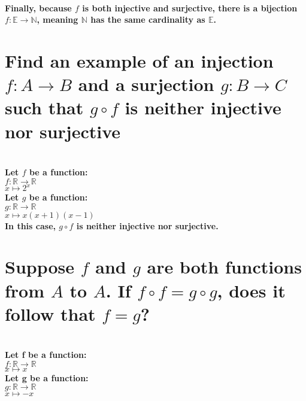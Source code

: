 \documentclass{article}
\begin{document}
\paragraph{\large
Finally, because \(f\) is both injective and surjective, there is a bijection \(f: \mathds{E} \rightarrow \mathds{N}\), meaning \(\mathds{N}\) has the same cardinality as \(\mathds{E}\).}

\newpage

\section{Find an example of an injection \(f: A \rightarrow B\) and a surjection \(g: B \rightarrow C\) such that \(g \circ f\) is neither injective nor surjective}

\paragraph{\large
\\Let \(f\) be a function:
\\\indent\(f: \mathds{R} \rightarrow \mathds{R}\)
\\\indent\(x \mapsto 2^x\)
\\ Let \(g\) be a function:
\\\indent \(g: \mathds{R} \rightarrow \mathds{R}\)
\\\indent \(x \mapsto x(x + 1)(x - 1)\)
\\ In this case, \(g \circ f\) is neither injective nor surjective.}

\newpage

\section{Suppose \(f\) and \(g\) are both functions from \(A\) to \(A\). If \(f \circ f = g \circ g\), does it follow that \(f = g\)?}

\paragraph{\large
\\ Let f be a function:
\\\indent \(f: \mathds{R} \rightarrow \mathds{R}\)
\\\indent \(x \mapsto x\)
\\ Let g be a function:
\\\indent \(g: \mathds{R} \rightarrow \mathds{R}\)
\\\indent \(x \mapsto -x\)}
\end{document}
